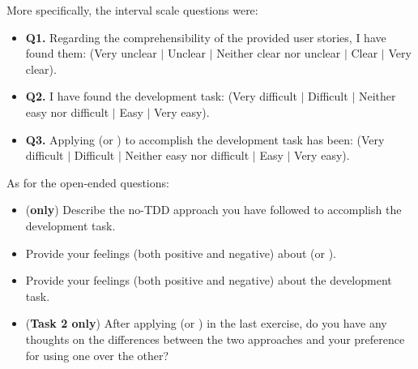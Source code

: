 More specifically, the interval scale questions were:
\begin{itemize}
    \item \textbf{Q1.} Regarding the comprehensibility of the provided user stories, I have found them: (Very unclear $|$ Unclear $|$ Neither clear nor unclear $|$ Clear $|$ Very clear).
    \item \textbf{Q2.} I have found the development task: (Very difficult $|$ Difficult $|$ Neither easy nor difficult $|$ Easy $|$ Very easy).
    \item \textbf{Q3.} Applying (\ie \tdd or \notdd) to accomplish the development task has been: (Very difficult $|$ Difficult $|$ Neither easy nor difficult $|$ Easy $|$ Very easy).
\end{itemize}

\noindent As for the open-ended questions:
\begin{itemize}
    \item (\textbf{\notdd only}) Describe the no-TDD approach you have followed to accomplish the development task.
    \item Provide your feelings (both positive and negative) about (\ie \tdd or \notdd).
    \item Provide your feelings (both positive and negative) about the development task.
    \item (\textbf{Task 2 only}) After applying (\ie \tdd or \notdd) in the last exercise, do you have any thoughts on the differences between the two approaches and your preference for using one over the other?
\end{itemize}

